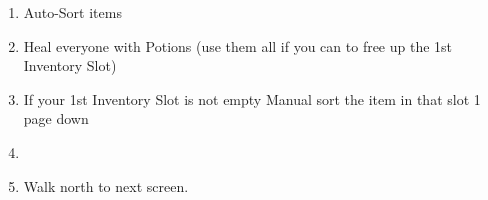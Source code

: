 \begin{enumerate}[resume]
    \item Auto-Sort items
    \item Heal everyone with Potions (use them all if you can to free up the 1st Inventory Slot)
    \item If your 1st Inventory Slot is not empty Manual sort the item in that slot 1 page down
    \item \formation{\tidus}{\wakka}{\auron}
    \item Walk north to next screen.
\end{enumerate}